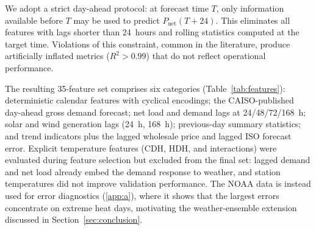 \documentclass[preprint,12pt,authoryear]{elsarticle}
\begin{document}
We adopt a strict day-ahead protocol: at forecast time $T$, only information available before $T$ may be used to predict $P_{\text{net}}(T+24)$. This eliminates all features with lags shorter than 24~hours and rolling statistics computed at the target time. Violations of this constraint, common in the literature, produce artificially inflated metrics ($R^2 > 0.99$) that do not reflect operational performance.

The resulting 35-feature set comprises six categories (Table~\ref{tab:features}): deterministic calendar features with cyclical encodings; the CAISO-published day-ahead gross demand forecast; net load and demand lags at 24/48/72/168~h; solar and wind generation lags (24~h, 168~h); previous-day summary statistics; and trend indicators plus the lagged wholesale price and lagged ISO forecast error. Explicit temperature features (CDH, HDH, and interactions) were evaluated during feature selection but excluded from the final set: lagged demand and net load already embed the demand response to weather, and station temperatures did not improve validation performance. The NOAA data is instead used for error diagnostics (\ref{app:a}), where it shows that the largest errors concentrate on extreme heat days, motivating the weather-ensemble extension discussed in Section~\ref{sec:conclusion}.

\begin{table}[htbp]
\centering
\caption{Feature categories for day-ahead net load forecasting (35 features).}
\label{tab:features}
\small
{}
\end{table}
\end{document}
